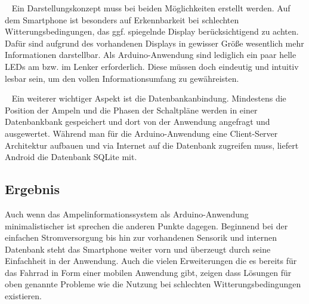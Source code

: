 \begin{description}[leftmargin=0.7cm,style=nextline]
  \item[Darstellung] ~ Ein Darstellungskonzept muss bei beiden Möglichkeiten erstellt werden. Auf dem \gls{Smartphone} ist besonders auf Erkennbarkeit bei schlechten Witterungsbedingungen, das ggf. spiegelnde Display berücksichtigend zu achten. Dafür sind aufgrund des vorhandenen Displays in gewisser Größe wesentlich mehr Informationen darstellbar. Als \gls{Arduino}-Anwendung sind lediglich ein paar helle \glspl{LED} am bzw. im Lenker erforderlich. Diese müssen doch eindeutig und intuitiv lesbar sein, um den vollen Informationsumfang zu gewähreisten.\\
 \item[Datenbankanbindung] ~ Ein weiterer wichtiger Aspekt ist die Datenbankanbindung. Mindestens die Position der Ampeln und die Phasen der Schaltpläne werden in einer Datenbankbank gespeichert und dort von der Anwendung angefragt und ausgewertet. Während man für die \gls{Arduino}-Anwendung eine Client-Server Architektur aufbauen und via Internet auf die Datenbank zugreifen muss, liefert Android die Datenbank SQLite mit.\\
\end{description}
\subsection*{Ergebnis}  
Auch wenn das Ampelinformationssystem als \gls{Arduino}-Anwendung minimalistischer ist sprechen die anderen Punkte dagegen. Beginnend bei der einfachen Stromversorgung bis hin zur vorhandenen Sensorik und internen Datenbank steht das \gls{Smartphone} weiter vorn und überzeugt durch seine Einfachheit in der Anwendung. Auch die vielen Erweiterungen die es bereits für das Fahrrad in Form einer mobilen Anwendung gibt, zeigen dass Lösungen für oben genannte Probleme wie die Nutzung bei schlechten Witterungsbedingungen existieren. 
